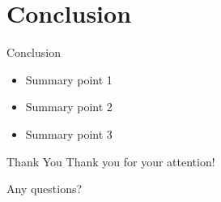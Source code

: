 \documentclass{beamer}
\begin{document}
\section{Conclusion}

\begin{frame}{Conclusion}
    \begin{itemize}
        \item Summary point 1
        \item Summary point 2
        \item Summary point 3
    \end{itemize}
\end{frame}

\begin{frame}{Thank You}
    \centering
    \huge Thank you for your attention!
    
    \vspace{1cm}
    
    \normalsize
    Any questions?
\end{frame}
\end{document}
